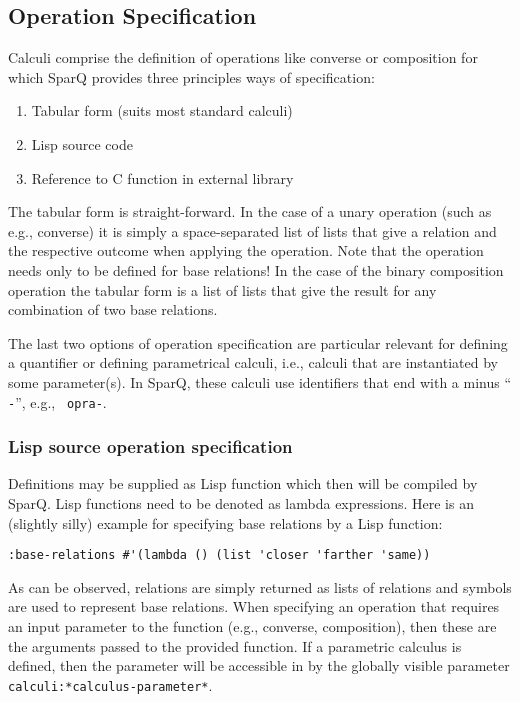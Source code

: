 \documentclass[headsepline]{scrreprt}
\theoremstyle{definition}
\newcommand{\engine}{SparQ}
\begin{document}
\subsection{Operation Specification}

Calculi comprise the definition of operations like converse or composition for which \engine{} provides three principles ways of specification:
\begin{enumerate}
	\item Tabular form (suits most standard calculi)
	\item Lisp source code
	\item Reference to C function in external library
\end{enumerate}

The tabular form is straight-forward. In the case of a unary operation (such as e.g., converse) it is simply a space-separated list of lists that give a relation and the respective outcome when applying the operation. Note that the operation needs only to be defined for base relations! In the case of the binary composition operation the tabular form is a list of lists that give the result for any combination of two base relations.

The last two options of operation specification are particular relevant for defining a quantifier or defining parametrical calculi, i.e., calculi that are instantiated by some parameter(s). In \engine{}, these calculi use identifiers that end with a minus ``\texttt{ -}'', e.g., \texttt{ opra-}.


\subsubsection{Lisp source operation specification}

Definitions may be supplied as Lisp function which then will be compiled by \engine{}. Lisp functions need to be denoted as lambda expressions. Here is an (slightly silly) example for specifying base relations by a Lisp function:

\begin{verbatim}
:base-relations #'(lambda () (list 'closer 'farther 'same))
\end{verbatim}

As can be observed, relations are simply returned as lists of relations and symbols are used to represent base relations. When specifying an operation that requires an input parameter to the function (e.g., converse, composition), then these are the arguments passed to the provided function. If a parametric calculus is defined, then the parameter will be accessible in by the globally visible parameter \texttt{ calculi:*calculus-parameter*}.
\end{document}
